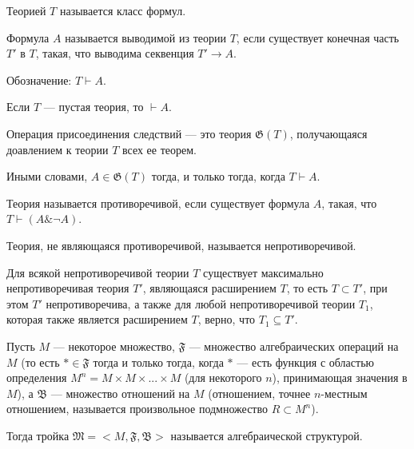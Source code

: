 
    \begin{Def}[Теория]
        Теорией $T$ называется класс формул.
    \end{Def}

    \begin{Def}
        Формула $A$ называется выводимой из теории $T$, если существует конечная часть $T'$ в $T$, такая, что выводима секвенция $T' \rightarrow A$.
    \end{Def}

    \begin{Rem}
        Обозначение: $T \vdash A$.

        Если $T$ --- пустая теория, то $\vdash A$.
    \end{Rem}

    \begin{Def}
        Операция присоединения следствий --- это теория $\mathfrak{G}(T)$, получающаяся доавлением к теории $T$ всех ее теорем.

        Иными словами, $A \in \mathfrak{G}(T)$ тогда, и только тогда, когда $T \vdash A$. 
    \end{Def}

    \begin{Def}
        Теория называется противоречивой, если существует формула $A$, такая, что $T \vdash (A \& \neg A)$.

        Теория, не являющаяся противоречивой, называется непротиворечивой.
    \end{Def}

    \begin{Rem}
        Для всякой непротиворечивой теории $T$ существует максимально непротиворечивая теория $T'$, являющаяся расширением $T$, то есть $T \subset T'$, при этом $T'$ непротиворечива, а также для любой непротиворечивой теории $T_1$, которая также является расширением $T$, верно, что $T_1 \subseteq T'$.
    \end{Rem}


    \begin{Def}
        Пусть $M$ --- некоторое множество, $\mathfrak{F}$ --- множество алгебраических операций на $M$ (то есть $* \in \mathfrak{F}$ тогда и только тогда, когда $*$ --- есть функция с областью определения $M^n = M \times M \times ... \times M$ (для некоторого $n$), принимающая значения в $M$), а $\mathfrak{B}$ --- множество отношений на $M$ (отношением, точнее $n$-местным отношением, называется произвольное подмножество $R \subset M^n$). 

        Тогда тройка $\mathfrak{M} = <M, \mathfrak{F}, \mathfrak{B}>$ называется алгебраической структурой.
    \end{Def}


